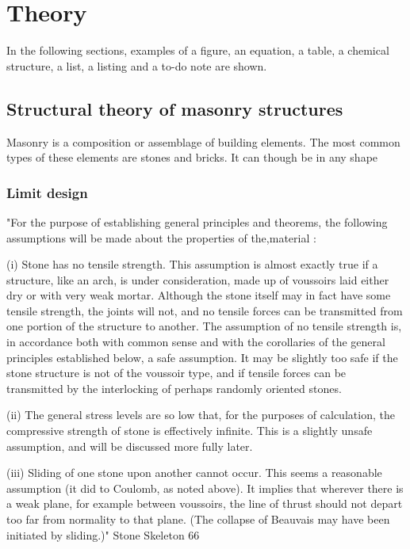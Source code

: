 \chapter{Theory}

In the following sections, examples of a figure, an equation, a table, a chemical structure, a list, a listing and a to-do note are shown.

\section{Structural theory of masonry structures}

Masonry is a composition or assemblage of building elements. The most common types of these elements are stones and bricks. It can though be in any shape


\subsection{Limit design}

"For the purpose of establishing general principles and theorems, the following
assumptions will be made about the properties of the,material :

(i) Stone has no tensile strength. This assumption is almost exactly true if a structure,
like an arch, is under consideration, made up of voussoirs laid either dry or with very
weak mortar. Although the stone itself may in fact have some tensile strength, the joints
will not, and no tensile forces can be transmitted from one portion of the structure to
another. The assumption of no tensile strength is, in accordance both with common sense
and with the corollaries of the general principles established below, a safe assumption.
It may be slightly too safe if the stone structure is not of the voussoir type, and if tensile
forces can be transmitted by the interlocking of perhaps randomly oriented stones.

(ii) The general stress levels are so low that, for the purposes of calculation, the compressive
strength of stone is effectively infinite. This is a slightly unsafe assumption, and
will be discussed more fully later.

(iii) Sliding of one stone upon another cannot occur. This seems a reasonable assumption
(it did to Coulomb, as noted above). It implies that wherever there is a weak plane, for
example between voussoirs, the line of thrust should not depart too far from normality
to that plane. (The collapse of Beauvais may have been initiated by sliding.)" Stone Skeleton 66

